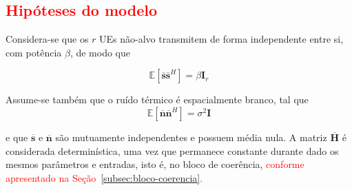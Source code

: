 \subsection{\texorpdfstring{\textcolor{red}{Hipóteses do modelo}}{Hipóteses do modelo}}

Considera-se que os $r$ UEs não-alvo transmitem de forma independente entre si, com potência $\beta$, de modo que 

$$
\mathbb{E}[\overline{\mathbf{s}}\overline{\mathbf{s}}^H]=\beta\mathbf{I}_r
$$

Assume-se também que o ruído térmico é espacialmente branco, tal que 
$$\mathbb{E}[\overline{\mathbf{n}}\overline{\mathbf{n}}^H]=\sigma^2\mathbf{I}
$$ 

e que $\overline{\mathbf{s}}$ e $\overline{\mathbf{n}}$ são mutuamente independentes e possuem média nula. A matriz $\overline{\mathbf{H}}$ é considerada determinística, uma vez que permanece constante durante dado os mesmos parâmetros e entradas, isto é, no bloco de coerência,
\textcolor{red}{conforme apresentado na Seção~{\hypersetup{linkcolor=red}\ref{subsec:bloco-coerencia}}.}

